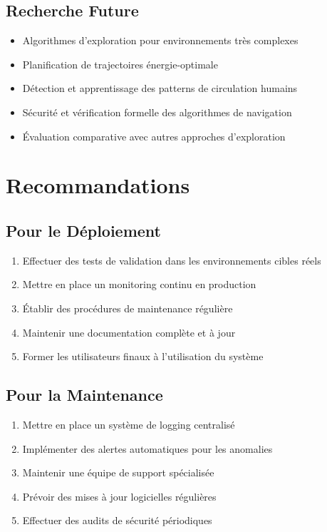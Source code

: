 \documentclass[12pt,a4paper,oneside]{report}
\begin{document}
\subsection{Recherche Future}

\begin{itemize}
  \item Algorithmes d'exploration pour environnements très complexes
  \item Planification de trajectoires énergie-optimale
  \item Détection et apprentissage des patterns de circulation humains
  \item Sécurité et vérification formelle des algorithmes de navigation
  \item Évaluation comparative avec autres approches d'exploration
\end{itemize}

\section{Recommandations}

\subsection{Pour le Déploiement}

\begin{enumerate}
  \item Effectuer des tests de validation dans les environnements cibles réels
  \item Mettre en place un monitoring continu en production
  \item Établir des procédures de maintenance régulière
  \item Maintenir une documentation complète et à jour
  \item Former les utilisateurs finaux à l'utilisation du système
\end{enumerate}

\subsection{Pour la Maintenance}

\begin{enumerate}
  \item Mettre en place un système de logging centralisé
  \item Implémenter des alertes automatiques pour les anomalies
  \item Maintenir une équipe de support spécialisée
  \item Prévoir des mises à jour logicielles régulières
  \item Effectuer des audits de sécurité périodiques
\end{enumerate}
\end{document}
